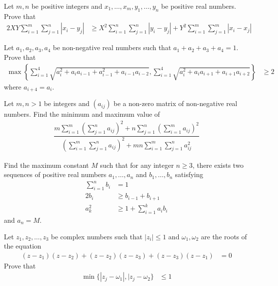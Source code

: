 \documentclass{subfile}
\begin{document}
		\begin{problem}
			Let $m,n$ be positive integers and $x_{1},\ldots,x_{m},y_{1},\ldots,y_{n}$ be positive real numbers. Prove that
				\begin{align*}
					2XY\sum_{i=1}^{m}\sum_{j=1}^{n}|x_{i}-y_{j}|
						& \geq X^{2}\sum_{i=1}^{n}\sum_{j=1}^{n}|y_{i}-y_{j}|+Y^{2}\sum_{i=1}^{m}\sum_{j=1}^{m}|x_{i}-x_{j}|
				\end{align*}
		\end{problem}
	
		\begin{problem}
			Let $a_{1},a_{2},a_{3},a_{4}$ be non-negative real numbers such that $a_{1}+a_{2}+a_{3}+a_{4}=1$. Prove that
				\begin{align*}
					\max\left\{\sum_{i=1}^{4}\sqrt{a_{i}^{2}+a_{i}a_{i-1}+a_{i-1}^{2}+a_{i-1}a_{i-2}},\sum_{i=1}^{4}\sqrt{a_{i}^{2}+a_{i}a_{i+1}+a_{i+1}a_{i+2}}\right\}
						& \geq 2
				\end{align*}
			where $a_{i+4}=a_i$.
		\end{problem}
	
		\begin{problem}
			Let $m,n>1$ be integers and $(a_{ij})$ be a non-zero matrix of non-negative real numbers. Find the minimum and maximum value of
				\begin{align*}
					\dfrac{m\sum_{i=1}^{m}\left(\sum_{j=1}^{n}a_{ij}\right)^{2}+n\sum_{j=1}^{n}\left(\sum_{i=1}^{m}a_{ij}\right)^{2}}{\left(\sum_{i=1}^{m}\sum_{j=1}^{n}a_{ij}\right)^{2}+mn\sum_{i=1}^{m}\sum_{j=1}^{n}a_{ij}^{2}}
				\end{align*}
		\end{problem}
	
		\begin{problem}
			Find the maximum constant $M$ such that for any integer $n\geq 3$, there exists two sequences of positive real numbers $a_{1},\ldots,a_{n}$ and $b_{1},\ldots,b_{n}$ satisfying
				\begin{align*}
					\sum_{i=1}^{n}b_{i}
						& = 1\\
					2b_{i}
						& \geq b_{i-1}+b_{i+1}\\
					a_{k}^{2}
						& \geq 1+\sum_{i=1}^{k}a_{i}b_{i}
				\end{align*}
			and $a_{n}=M$.
		\end{problem}
	
		\begin{problem}
			Let $z_{1},z_{2},\ldots,z_{3}$ be complex numbers such that $|z_{i}|\leq 1$ and $\omega_{1},\omega_{2}$ are the roots of the equation
				\begin{align*}
					(z-z_{1})(z-z_{2})+(z-z_{2})(z-z_{3})+(z-z_{3})(z-z_{1})
						& = 0
				\end{align*}
			Prove that
				\begin{align*}
					\min\{|z_{j}-\omega_{1}|,|z_{j}-\omega_{2}\}
						& \leq 1
				\end{align*}
		\end{problem}
	
\end{document}
